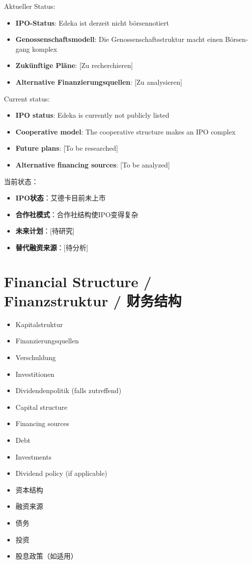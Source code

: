 \begin{otherlanguage}{ngerman}
Aktueller Status:
\begin{itemize}
    \item \textbf{IPO-Status}: Edeka ist derzeit nicht börsennotiert
    \item \textbf{Genossenschaftsmodell}: Die Genossenschaftsstruktur macht einen Börsengang komplex
    \item \textbf{Zukünftige Pläne}: [Zu recherchieren]
    \item \textbf{Alternative Finanzierungsquellen}: [Zu analysieren]
\end{itemize}
\end{otherlanguage}

Current status:
\begin{itemize}
    \item \textbf{IPO status}: Edeka is currently not publicly listed
    \item \textbf{Cooperative model}: The cooperative structure makes an IPO complex
    \item \textbf{Future plans}: [To be researched]
    \item \textbf{Alternative financing sources}: [To be analyzed]
\end{itemize}

当前状态：
\begin{itemize}
    \item \textbf{IPO状态}：艾德卡目前未上市
    \item \textbf{合作社模式}：合作社结构使IPO变得复杂
    \item \textbf{未来计划}：[待研究]
    \item \textbf{替代融资来源}：[待分析]
\end{itemize}

\section{Financial Structure / Finanzstruktur / 财务结构}

\begin{otherlanguage}{ngerman}
\begin{itemize}
    \item Kapitalstruktur
    \item Finanzierungsquellen
    \item Verschuldung
    \item Investitionen
    \item Dividendenpolitik (falls zutreffend)
\end{itemize}
\end{otherlanguage}

\begin{itemize}
    \item Capital structure
    \item Financing sources
    \item Debt
    \item Investments
    \item Dividend policy (if applicable)
\end{itemize}

\begin{itemize}
    \item 资本结构
    \item 融资来源
    \item 债务
    \item 投资
    \item 股息政策（如适用）
\end{itemize}
